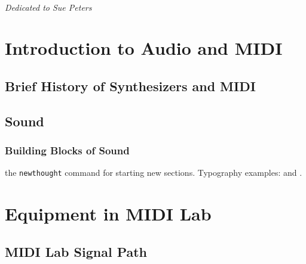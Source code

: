 \documentclass{tufte-book} %
\begin{document}
\cleardoublepage
~\vfill
\begin{doublespace}
\noindent\fontsize{18}{22}\selectfont\itshape
\nohyphenation
Dedicated to Sue Peters
\end{doublespace}
\vfill
\vfill
\graphicspath{{LaTeX/}}
\justify
\cleardoublepage
\chapter{Introduction to Audio and MIDI} %

\section{Brief History of Synthesizers and MIDI}
\section{Sound}
\subsection{Building Blocks of Sound}


 the \texttt{newthought} command for starting new sections. Typography examples:  and .


\mainmatter


\chapter{Equipment in MIDI Lab}
\label{ch:1}


\section{MIDI Lab Signal Path} 
\end{document}
